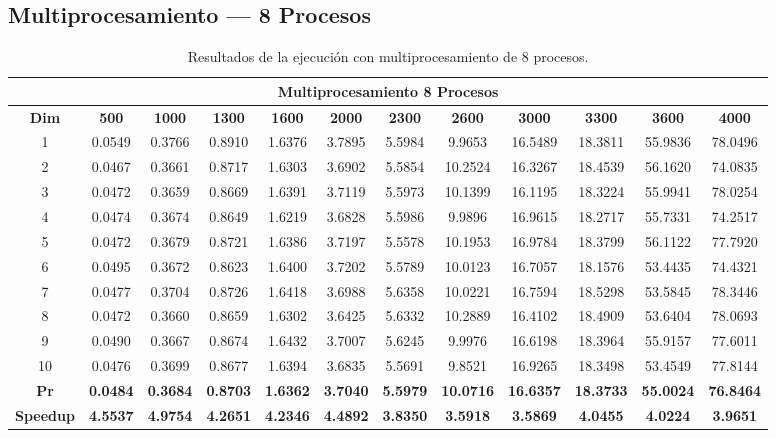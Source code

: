 \documentclass{article}
\begin{document}

\subsection{Multiprocesamiento --- 8 Procesos}

\begin{table}[H]
\centering
\tiny
\begin{tabular}{|c|c|c|c|c|c|c|c|c|c|c|c|}
\hline
\multicolumn{12}{|c|}{\textbf{Multiprocesamiento 8 Procesos}} \\
\hline
\textbf{Dim} & \textbf{500} & \textbf{1000} & \textbf{1300} & \textbf{1600} & \textbf{2000} & \textbf{2300} & \textbf{2600} & \textbf{3000} & \textbf{3300} & \textbf{3600} & \textbf{4000} \\
\hline
1  & 0.0549 & 0.3766 & 0.8910 & 1.6376 & 3.7895 & 5.5984 & 9.9653 & 16.5489 & 18.3811 & 55.9836 & 78.0496 \\
2  & 0.0467 & 0.3661 & 0.8717 & 1.6303 & 3.6902 & 5.5854 & 10.2524 & 16.3267 & 18.4539 & 56.1620 & 74.0835 \\
3  & 0.0472 & 0.3659 & 0.8669 & 1.6391 & 3.7119 & 5.5973 & 10.1399 & 16.1195 & 18.3224 & 55.9941 & 78.0254 \\
4  & 0.0474 & 0.3674 & 0.8649 & 1.6219 & 3.6828 & 5.5986 & 9.9896 & 16.9615 & 18.2717 & 55.7331 & 74.2517 \\
5  & 0.0472 & 0.3679 & 0.8721 & 1.6386 & 3.7197 & 5.5578 & 10.1953 & 16.9784 & 18.3799 & 56.1122 & 77.7920 \\
6  & 0.0495 & 0.3672 & 0.8623 & 1.6400 & 3.7202 & 5.5789 & 10.0123 & 16.7057 & 18.1576 & 53.4435 & 74.4321 \\
7  & 0.0477 & 0.3704 & 0.8726 & 1.6418 & 3.6988 & 5.6358 & 10.0221 & 16.7594 & 18.5298 & 53.5845 & 78.3446 \\
8  & 0.0472 & 0.3660 & 0.8659 & 1.6302 & 3.6425 & 5.6332 & 10.2889 & 16.4102 & 18.4909 & 53.6404 & 78.0693 \\
9  & 0.0490 & 0.3667 & 0.8674 & 1.6432 & 3.7007 & 5.6245 & 9.9976 & 16.6198 & 18.3964 & 55.9157 & 77.6011 \\
10 & 0.0476 & 0.3699 & 0.8677 & 1.6394 & 3.6835 & 5.5691 & 9.8521 & 16.9265 & 18.3498 & 53.4549 & 77.8144 \\
\hline
\textbf{Pr} & \textbf{0.0484} & \textbf{0.3684} & \textbf{0.8703} & \textbf{1.6362} & \textbf{3.7040} & \textbf{5.5979} & \textbf{10.0716} & \textbf{16.6357} & \textbf{18.3733} & \textbf{55.0024} & \textbf{76.8464} \\
\hline
\textbf{Speedup} & \textbf{4.5537} & \textbf{4.9754} & \textbf{4.2651} & \textbf{4.2346} & \textbf{4.4892} & \textbf{3.8350} & \textbf{3.5918} & \textbf{3.5869} & \textbf{4.0455} & \textbf{4.0224} & \textbf{3.9651} \\
\hline
\end{tabular}
\caption{Resultados de la ejecución con multiprocesamiento de 8 procesos.}
\label{tab:mp8}
\end{table}
\end{document}
